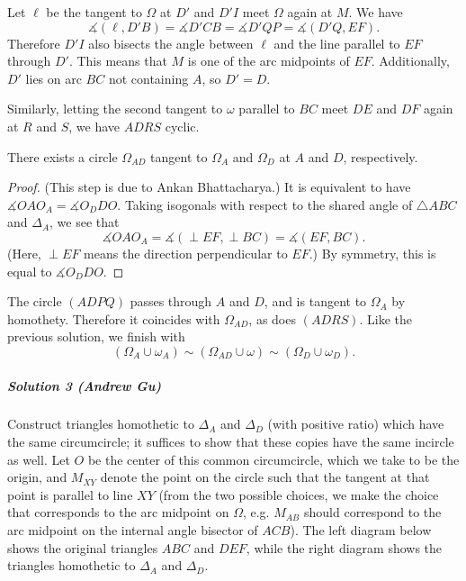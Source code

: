 Let $\ell$ be the tangent to $\Omega$ at $D'$ and $D'I$ meet $\Omega$ again at
$M$. We have
\[
  \measuredangle(\ell, D'B) = \measuredangle D'CB = \measuredangle D'QP =
  \measuredangle(D'Q, EF).
\]
Therefore $D'I$ also bisects the angle between $\ell$ and the line parallel to
$EF$ through $D'$. This means that $M$ is one of the arc midpoints of $EF$.
Additionally, $D'$ lies on arc $BC$ not containing $A$, so $D'=D$.

Similarly, letting the second tangent to $\omega$ parallel to $BC$ meet $DE$ and
$DF$ again at $R$ and $S$, we have $ADRS$ cyclic.

\begin{lemma*}
  There exists a circle $\Omega_{AD}$ tangent to $\Omega_A$ and $\Omega_D$ at
  $A$ and $D$, respectively.
\end{lemma*}
\begin{proof}
  (This step is due to Ankan Bhattacharya.) It is equivalent to have
  $\measuredangle OAO_A = \measuredangle O_DDO$. Taking isogonals with respect
  to the shared angle of $\triangle ABC$ and $\Delta_A$, we see that
  \[\measuredangle OAO_A = \measuredangle(\perp EF, \perp BC) = \measuredangle
  (EF, BC).\]
  (Here, $\perp EF$ means the direction perpendicular to $EF$.) By symmetry,
  this is equal to $\measuredangle O_DDO$.
\end{proof}

The circle $(ADPQ)$ passes through $A$ and $D$, and is tangent to $\Omega_A$ by
homothety. Therefore it coincides with $\Omega_{AD}$, as does $(ADRS)$. Like the
previous solution, we finish with
\[(\Omega_A\cup \omega_A)\sim (\Omega_{AD}\cup \omega)\sim (\Omega_D\cup
\omega_D).\]

\subparagraph{Solution 3 (Andrew Gu)}
Construct triangles homothetic to $\Delta_A$ and $\Delta_D$ (with positive ratio) which
have the same circumcircle; it suffices to show that these copies have the same
incircle as well. Let $O$ be the center of this common circumcircle, which we
take to be the origin, and $M_{XY}$ denote the point on the circle such that the
tangent at that point is parallel to line $XY$ (from the two possible choices,
we make the choice that corresponds to the arc midpoint on $\Omega$, e.g. $M_{AB}$
should correspond to the arc midpoint on the internal angle bisector of $ACB$).
The left diagram below shows the original triangles $ABC$ and $DEF$, while the
right diagram shows the triangles homothetic to $\Delta_A$ and $\Delta_D$.

